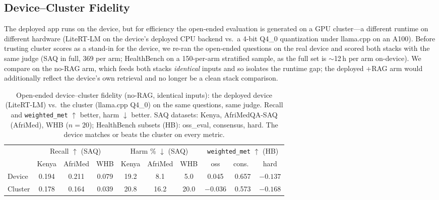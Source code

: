 \subsection{Device--Cluster Fidelity}
\label{sec:calibration}

The deployed app runs on the device, but for efficiency the open-ended
evaluation is generated on a GPU cluster---a different runtime on different
hardware (LiteRT-LM on the device's deployed CPU backend vs.\ a 4-bit Q4\_0
quantization under llama.cpp on an A100). Before trusting cluster scores as a
stand-in for the device, we re-ran the open-ended questions on the real
device and scored both stacks with the same judge (SAQ in full, 369 per arm;
HealthBench on a 150-per-arm stratified sample, as the full set is
$\sim$12\,h per arm on-device). We compare on the no-RAG arm, which feeds
both stacks \emph{identical} inputs and so isolates the runtime gap; the
deployed +RAG arm would additionally reflect the device's own retrieval and
no longer be a clean stack comparison.

\begin{table}[t]
\caption{Open-ended device--cluster fidelity (no-RAG, identical inputs): the
deployed device (LiteRT-LM) vs.\ the cluster (llama.cpp Q4\_0) on the same
questions, same judge. Recall and \texttt{weighted\_met} $\uparrow$ better,
harm $\downarrow$ better. SAQ datasets: Kenya, AfriMedQA-SAQ (AfriMed),
WHB ($n{=}20$); HealthBench subsets (HB): oss\_eval, consensus, hard. The
device matches or beats the cluster on every metric.}
\label{tab:calib}
\centering
\setlength{\tabcolsep}{4pt}
\small
\begin{tabular}{@{}lccccccccc@{}}
\toprule
& \multicolumn{3}{c}{Recall $\uparrow$ (SAQ)}
& \multicolumn{3}{c}{Harm \% $\downarrow$ (SAQ)}
& \multicolumn{3}{c}{\texttt{weighted\_met} $\uparrow$ (HB)} \\
\cmidrule(lr){2-4}\cmidrule(lr){5-7}\cmidrule(lr){8-10}
& Kenya & AfriMed & WHB & Kenya & AfriMed & WHB & oss & cons.\ & hard \\
\midrule
Device  & 0.194 & 0.211 & 0.079 & 19.2 & 8.1 & 5.0 & 0.045 & 0.657 & $-0.137$ \\
Cluster & 0.178 & 0.164 & 0.039 & 20.8 & 16.2 & 20.0 & $-0.036$ & 0.573 & $-0.168$ \\
\bottomrule
\end{tabular}
\end{table}

